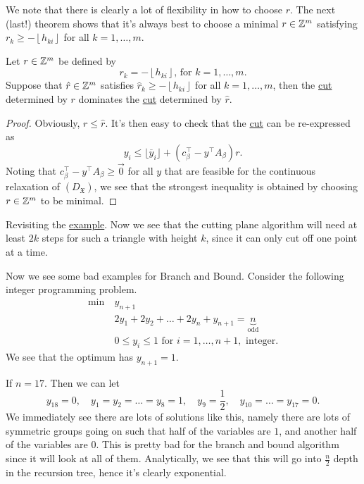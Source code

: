 We note that there is clearly a lot of flexibility in how to choose \(r\). The next (last!) theorem shows
that it's always best to choose a minimal \(r\in \mathbb{\MakeUppercase{z}} ^m\)  satisfying \(r_k \geq -\left\lfloor h_{ki} \right\rfloor\) for all \(k = 1, \ldots  , m\).

\begin{theorem}\label{thm:lec24-3}
	Let \(r\in \mathbb{\MakeUppercase{z}} ^m\) be defined by
	\[
		r_k = -\left\lfloor h_{ki} \right\rfloor\text{, for }k = 1, \ldots , m.
	\]
	Suppose that \(\hat{r} \in \mathbb{\MakeUppercase{z}} ^m\) satisfies \(\hat{r}_k \geq -\left\lfloor h_{ki} \right\rfloor\) for all \(k = 1, \ldots , m\), then
	the \hyperref[def:Chvatal-Gomory-cut]{cut} determined by \(r\) dominates the \hyperref[def:Chvatal-Gomory-cut]{cut} determined by \(\hat{r} \).
\end{theorem}
\begin{proof}
	Obviously, \(r \leq \hat{r} \). It's then easy to check that the \hyperref[def:Chvatal-Gomory-cut]{cut} can be re-expressed as
	\[
		y_{i} \leq \lfloor \overline{y} _{i} \rfloor + (c^{\top} _\beta - y^{\top} A_\beta )r.
	\]
	Noting that \(c^{\top} _\beta - y^{\top} A_\beta \geq \vec{0} \) for all \(y\) that are feasible for the continuous relaxation of \((D_{\mathfrak{X}})\),
	we see that the strongest inequality is obtained by choosing \(r\in\mathbb{\MakeUppercase{z}} ^m\) to be minimal.
\end{proof}

Revisiting the \hyperref[eg:branch-and-bound]{example}. Now we see that the cutting plane algorithm will need at least \(2k\) steps
for such a triangle with height \(k\), since it can only cut off one point at a time.

\begin{eg}
	Now we see some bad examples for Branch and Bound. Consider the following integer programming problem.
	\begin{align*}
		\min~ & y_{n+1}                                                              \\
		      & 2y_{1} + 2y_2 + \ldots +2y_n + y_{n+1} = \underbrace{n}_{\text{odd}} \\
		      & 0\leq y_{i}\leq 1 \text{ for }i = 1, \ldots , n+1, \text{ integer}.
	\end{align*}
	We see that the optimum has \(y_{n+1} = 1\).

	If \(n = 17\). Then we can let
	\[
		y_{18} = 0,\quad y_1 = y_2 = \ldots = y_8 = 1,\quad y_9 = \frac{1}{2},\quad y_{10} = \ldots = y_{17} = 0.
	\]
	We immediately see there are lots of solutions like this, namely there are lots of symmetric groups going on such that
	half of the variables are \(1\), and another half of the variables are \(0\). This is pretty bad
	for the branch and bound algorithm since it will look at all of them. Analytically, we see that this will go into \(\frac{n}{2}\)
	depth in the recursion tree, hence it's clearly exponential.
\end{eg}

